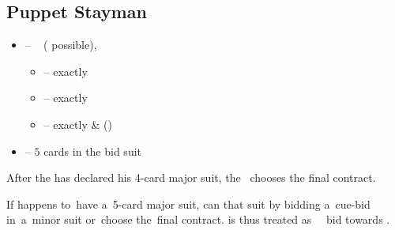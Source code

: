 \subsection{Puppet Stayman}
\label{subsec:puppet-stayman}

\begin{itemize}
  \item \ctr{3\d} -- \no\  ( possible), \wait
  \begin{itemize}
    \item \ctr{3\h} -- exactly 
    \item \ctr{3\s} -- exactly 
    \item \ctr{3\nt} -- exactly  \&  (\so)
  \end{itemize}
  \item \ctr{3\major} -- $5$ cards in the bid suit
\end{itemize}

After the \resp\/ has declared his 4-card major suit, the~\opn\/ chooses the final contract.\vspace{1em}

If \opn\/ happens to~have a~5-card major suit, \resp\/ can \settle\/ that suit by bidding a~cue-bid in~a~minor suit
or~choose the~final contract. \ctr{4\nt} is thus treated as~\nat\ \inv\/ bid towards \ctr{6\nt}.
